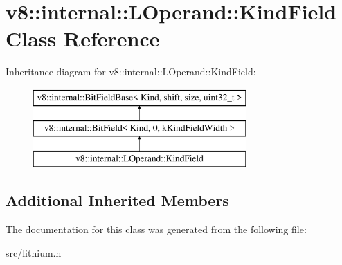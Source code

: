 \hypertarget{classv8_1_1internal_1_1_l_operand_1_1_kind_field}{}\section{v8\+:\+:internal\+:\+:L\+Operand\+:\+:Kind\+Field Class Reference}
\label{classv8_1_1internal_1_1_l_operand_1_1_kind_field}
Inheritance diagram for v8\+:\+:internal\+:\+:L\+Operand\+:\+:Kind\+Field\+:\begin{figure}[H]
\begin{center}
\leavevmode
\includegraphics[height=3.000000cm]{classv8_1_1internal_1_1_l_operand_1_1_kind_field}
\end{center}
\end{figure}
\subsection*{Additional Inherited Members}


The documentation for this class was generated from the following file\+:\begin{DoxyCompactItemize}
\item 
src/lithium.\+h\end{DoxyCompactItemize}
